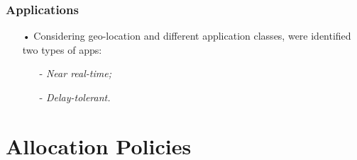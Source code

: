 \documentclass[10pt, pdf, xcolor=pdftex, dvipsnames, table]{beamer}
\begin{document}
\begin{frame}
	\frametitle{Applications}
 	\begin{block}{}
 		\begin{itemize}
 		    \item[•] Considering geo-location and different application classes, were identified two types of apps:\newline
 				\begin{itemize}
 		    		\item[-] \footnotesize\textit{Near real-time;}\newline
 		    		\item[-] \footnotesize\textit{Delay-tolerant.}
 		    	\end{itemize}
 		\end{itemize}
 	\end{block}
\end{frame}

\begin{frame}

\end{frame}

\begin{frame}

\end{frame}

\section[Allocation Policies]{Allocation Policies}

\begin{frame}
	\tableofcontents[currentsection]
\end{frame}

\begin{frame}
\end{frame}
\end{document}
